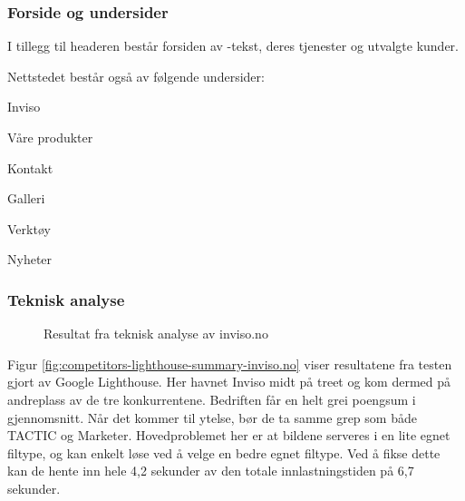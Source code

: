 \subsubsection{Forside og undersider}
I tillegg til headeren består forsiden av -tekst, deres tjenester og utvalgte kunder. 

Nettstedet består også av følgende undersider:
\begin{compactitem}
\item Inviso
\item Våre produkter
\item Kontakt
\item Galleri
\item Verktøy
\item Nyheter
\end{compactitem}

\subsubsection{Teknisk analyse}

\begin{figure}[H]
    \begin{center}
        
        \label{fig:competitors-tech_analysis-inviso.no}
        \caption{Resultat fra teknisk analyse av inviso.no}
    \end{center}
\end{figure}

Figur \ref{fig:competitors-lighthouse-summary-inviso.no} viser resultatene fra testen gjort av Google Lighthouse. Her havnet Inviso midt på treet og kom dermed på andreplass av de tre konkurrentene. Bedriften får en helt grei poengsum i gjennomsnitt. Når det kommer til ytelse, bør de ta samme grep som både TACTIC og Marketer. Hovedproblemet her er at bildene serveres i en lite egnet filtype, og kan enkelt løse ved å velge en bedre egnet filtype. Ved å fikse dette kan de hente inn hele 4,2 sekunder av den totale innlastningstiden på 6,7 sekunder.

